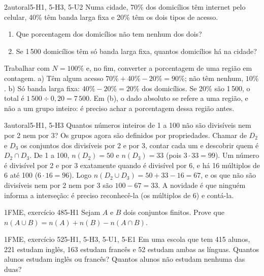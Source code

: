 \begin{exemplo}{}{2}{autoral}{5-H1, 5-H3, 5-U2}
\label{ex:u5:internet}
Numa cidade, 70\% dos domicílios têm internet pelo celular, 40\% têm banda larga fixa e 20\% têm os dois tipos de acesso.
\begin{enumerate}[label=\alph*)]
  \item Que porcentagem dos domicílios não tem nenhum dos dois?
  \item Se 1\,500 domicílios têm só banda larga fixa, quantos domicílios há na cidade?
\end{enumerate}
\plano Trabalhar com $N=100\%$ e, no fim, converter a porcentagem de uma região em contagem.
\resolucao a) Têm algum acesso $70\%+40\%-20\%=90\%$; não têm nenhum, $10\%$. b) Só banda larga fixa: $40\%-20\%=20\%$ dos domicílios. Se 20\% são 1\,500, o total é $1\,500\div0{,}20=7\,500$.
\comentario Em (b), o dado absoluto se refere a uma região, e não a um grupo inteiro: é preciso achar a porcentagem dessa região antes.
\end{exemplo}

\begin{exemplo}{}{3}{autoral}{5-H1, 5-H3}
\label{ex:u5:divisiveis}
Quantos números inteiros de 1 a 100 não são divisíveis nem por 2 nem por 3?
\plano Os grupos agora são definidos por propriedades. Chamar de $D_2$ e $D_3$ os conjuntos dos divisíveis por 2 e por 3, contar cada um e descobrir quem é $D_2\cap D_3$.
\resolucao De 1 a 100, $n(D_2)=50$ e $n(D_3)=33$ (pois $3\cdot33=99$). Um número é divisível por 2 e por 3 exatamente quando é divisível por 6, e há 16 múltiplos de 6 até 100 ($6\cdot16=96$). Logo $n(D_2\cup D_3)=50+33-16=67$, e os que não são divisíveis nem por 2 nem por 3 são $100-67=33$.
\comentario A novidade é que ninguém informa a interseção: é preciso reconhecê-la (os múltiplos de 6) e contá-la.
\end{exemplo}

\Questoes

\begin{questao}{1}{FME, exercício 48}{5-H1}\label{u5:fme48}
Sejam $A$ e $B$ dois conjuntos finitos. Prove que $n(A\cup B)=n(A)+n(B)-n(A\cap B)$.
\end{questao}

\begin{questao}{1}{FME, exercício 52}{5-H1, 5-H3, 5-U1, 5-E1}\label{u5:fme52}
Em uma escola que tem 415 alunos, 221 estudam inglês, 163 estudam francês e 52 estudam ambas as línguas. Quantos alunos estudam inglês ou francês? Quantos alunos não estudam nenhuma das duas?
\end{questao}

